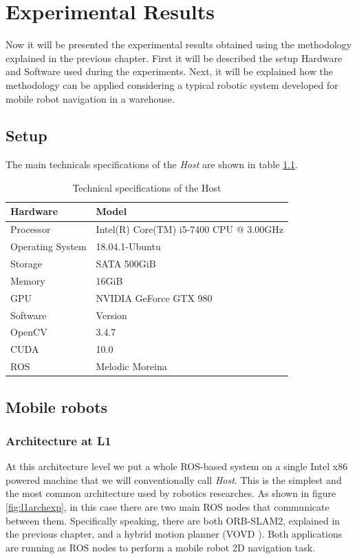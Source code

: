 \chapter{Experimental Results} \label{chap:experimental-results}
Now it will be presented the experimental results obtained using the methodology explained in the previous chapter.
First it will be described the setup Hardware and Software used during the experiments. Next, it will be explained how the methodology can be applied considering a typical robotic system developed for mobile robot navigation in a warehouse.


\section{Setup}
The main technicals specifications of the \textit{Host} are shown in table \ref{tab:tech-specs-host}.

\begin{table}[ht!]
	\centering
	\begin{tabular}{|l|l|}
		\hline
		\rowcolor{Gray}
		Hardware 			& Model 												\\
		\hline
		Processor 			& Intel(R) Core(TM) i5-7400 CPU @ 3.00GHz				\\
		Operating System 	& 18.04.1-Ubuntu										\\
		Storage 			& SATA 500GiB											\\
		Memory				& 16GiB													\\
		GPU					& NVIDIA GeForce GTX 980								\\
		\hline
		\rowcolor{Gray}
		Software 			& Version 												\\
		\hline
		OpenCV				& 3.4.7													\\
		CUDA				& 10.0													\\
		ROS					& Melodic Moreina										\\
		\hline
	\end{tabular}
	\caption{Technical specifications of the Host \label{tab:tech-specs-host}}
\end{table}

\section{Mobile robots}




\subsection{Architecture at L1}
At this architecture level we put a whole ROS-based system on a single Intel x86 powered machine that we will conventionally call \textit{Host}. 
This is the simplest and the most common architecture used by robotics researches. As shown in figure \ref{fig:l1archexp}, in this case there are two main ROS nodes that communicate between them. Specifically speaking, there are both ORB-SLAM2, explained in the previous chapter, and a hybrid motion planner (VOVD \cite{VOVD}). Both applications are running as ROS nodes to perform a mobile robot 2D navigation task.

